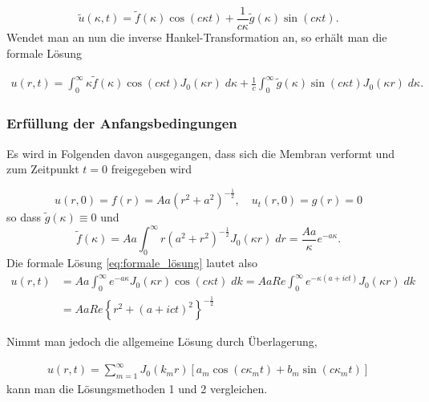 \begin{equation*}
	\tilde{u}(\kappa,t)=\tilde{f}(\kappa)\cos(c\kappa t) + \frac{1}{c\kappa}\tilde{g}(\kappa)\sin(c\kappa t).
\end{equation*}
Wendet man an nun die inverse Hankel-Transformation an, so erhält man die formale Lösung

\begin{align}
	u(r,t)=\int_{0}^{\infty}\kappa\tilde{f}(\kappa)\cos(c\kappa t) J_0(\kappa r) \; d\kappa +\frac{1}{c}\int_{0}^{\infty}\tilde{g}(\kappa)\sin(c\kappa t)J_0(\kappa r) \; d\kappa.
	\label{eq:formale_lösung}
\end{align}

\subsubsection{Erfüllung der Anfangsbedingungen\label{subsub:erfüllung_AB}}
Es wird in Folgenden davon ausgegangen, dass sich die Membran verformt und zum Zeitpunkt $t=0$ freigegeben wird

\begin{equation*}
	u(r,0)=f(r)=Aa(r^2 + a^2)^{-\frac{1}{2}}, \quad u_t(r,0)=g(r)=0
\end{equation*}
so dass $\tilde{g}(\kappa)\equiv 0$ und
\begin{equation*}
	\tilde{f}(\kappa)=Aa\int_{0}^{\infty}r(a^2 + r^2)^{-\frac{1}{2}} J_0 (\kappa r) \; dr=\frac{Aa}{\kappa}e^{-a\kappa}.
\end{equation*}
Die formale Lösung  \eqref{eq:formale_lösung} lautet also
\begin{align*}
	u(r,t)&=Aa\int_{0}^{\infty}e^{-a\kappa} J_0(\kappa r)\cos(c\kappa t) \; dk=AaRe\int_{0}^{\infty}e^{-\kappa(a+ict)} J_0(\kappa r) \; dk\\
	&=AaRe\left\{r^2+\left(a+ict\right)^2\right\}^{-\frac{1}{2}}
\end{align*}

Nimmt man jedoch die allgemeine Lösung durch Überlagerung, 

\begin{align}
	u(r, t) = \displaystyle\sum_{m=1}^{\infty} J_0 (k_{m}r)[a_{m}\cos(c \kappa_{m} t)+b_{m}\sin(c \kappa_{m} t)]
	\label{eq:lösung_unendliche_generelle}
\end{align}
kann man die Lösungsmethoden 1 und 2 vergleichen.

